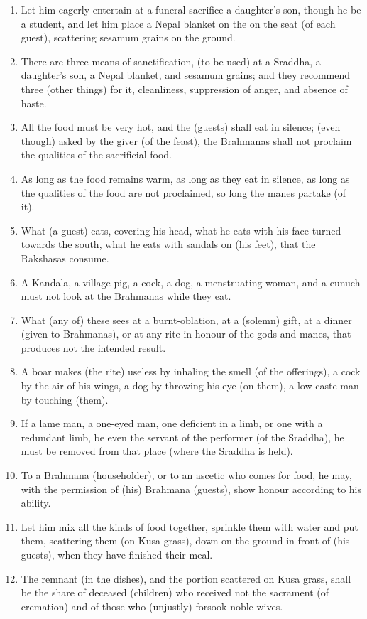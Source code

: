 \begin{enumerate}
\item Let him eagerly entertain at a funeral sacrifice a daughter's son, though he be a student, and let him place a Nepal blanket on the on the seat (of each guest), scattering sesamum grains on the ground.
\item There are three means of sanctification, (to be used) at a Sraddha, a daughter's son, a Nepal blanket, and sesamum grains; and they recommend three (other things) for it, cleanliness, suppression of anger, and absence of haste.
\item All the food must be very hot, and the (guests) shall eat in silence; (even though) asked by the giver (of the feast), the Brahmanas shall not proclaim the qualities of the sacrificial food.
\item As long as the food remains warm, as long as they eat in silence, as long as the qualities of the food are not proclaimed, so long the manes partake (of it).
\item What (a guest) eats, covering his head, what he eats with his face turned towards the south, what he eats with sandals on (his feet), that the Rakshasas consume.
\item A Kandala, a village pig, a cock, a dog, a menstruating woman, and a eunuch must not look at the Brahmanas while they eat.
\item What (any of) these sees at a burnt-oblation, at a (solemn) gift, at a dinner (given to Brahmanas), or at any rite in honour of the gods and manes, that produces not the intended result.
\item A boar makes (the rite) useless by inhaling the smell (of the offerings), a cock by the air of his wings, a dog by throwing his eye (on them), a low-caste man by touching (them).
\item If a lame man, a one-eyed man, one deficient in a limb, or one with a redundant limb, be even the servant of the performer (of the Sraddha), he must be removed from that place (where the Sraddha is held).
\item To a Brahmana (householder), or to an ascetic who comes for food, he may, with the permission of (his) Brahmana (guests), show honour according to his ability.
\item Let him mix all the kinds of food together, sprinkle them with water and put them, scattering them (on Kusa grass), down on the ground in front of (his guests), when they have finished their meal.
\item The remnant (in the dishes), and the portion scattered on Kusa grass, shall be the share of deceased (children) who received not the sacrament (of cremation) and of those who (unjustly) forsook noble wives.

\end{enumerate}
